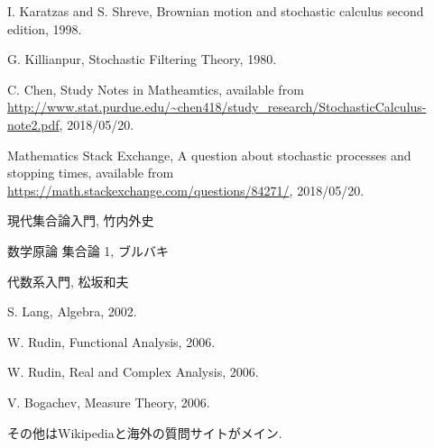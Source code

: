 \begin{thebibliography}{数字}
	 I. Karatzas and S. Shreve, Brownian motion and stochastic calculus second edition, 1998.
	
	 G. Killianpur, Stochastic Filtering Theory, 1980. 
	
	 C. Chen, Study Notes in Matheamtics, available from \url{http://www.stat.purdue.edu/~chen418/study_research/StochasticCalculus-note2.pdf}, 2018/05/20.

	 Mathematics Stack Exchange, A question about stochastic processes and stopping times, available from \url{https://math.stackexchange.com/questions/84271/}, 2018/05/20.
	
	 現代集合論入門, 竹内外史
	
	 数学原論 集合論 1, ブルバキ
	
	 代数系入門, 松坂和夫
	
	 S. Lang, Algebra, 2002.
	
	 W. Rudin, Functional Analysis, 2006.
	
	 W. Rudin, Real and Complex Analysis, 2006.
	
	 V. Bogachev, Measure Theory, 2006.
	
	 その他はWikipediaと海外の質問サイトがメイン.
\end{thebibliography}